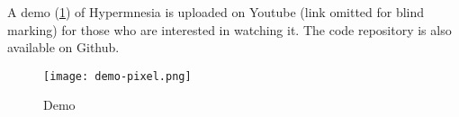 A demo (\cref{fig:demo}) of Hypermnesia is 
uploaded on Youtube (link omitted for blind marking) for those who are interested 
in watching it. The code repository is also available on Github.


\begin{figure}[htp]
  \centering
  \texttt{[image: demo-pixel.png]}   
  \caption{Demo}
  \label{fig:demo}
\end{figure}


